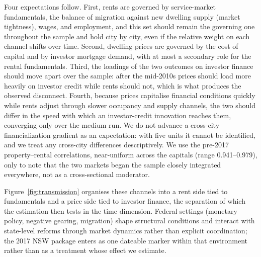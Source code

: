 \documentclass[preprint,11pt,authoryear]{elsarticle}
\begin{document}
Four expectations follow. First, rents are governed by service-market
fundamentals, the balance of migration against new dwelling supply
(market tightness), wages, and employment, and this set should remain the
governing one throughout the sample and hold city by city, even if the
relative weight on each channel shifts over time. Second, dwelling prices
are governed by the cost of capital and by investor mortgage demand, with
at most a secondary role for the rental fundamentals. Third, the loadings
of the two outcomes on investor finance should move apart over the sample:
after the mid-2010s prices should load more heavily on investor credit
while rents should not, which is what produces the observed disconnect.
Fourth, because prices capitalise financial conditions quickly while rents
adjust through slower occupancy and supply channels, the two should differ
in the speed with which an investor-credit innovation reaches them,
converging only over the medium run. We do not advance a cross-city
financialization gradient as an expectation: with five units it cannot be
identified, and we treat any cross-city differences descriptively. We use
the pre-2017 property--rental correlations, near-uniform across the
capitals (range 0.941--0.979), only to note that the two markets began the
sample closely integrated everywhere, not as a cross-sectional moderator.

Figure~\ref{fig:transmission} organises these channels into a rent side
tied to fundamentals and a price side tied to investor finance, the
separation of which the estimation then tests in the time dimension.
Federal settings (monetary policy, negative gearing, migration) shape
structural conditions and interact with state-level reforms through
market dynamics rather than explicit coordination; the 2017 NSW package
enters as one dateable marker within that environment rather than as a
treatment whose effect we estimate.
\end{document}

